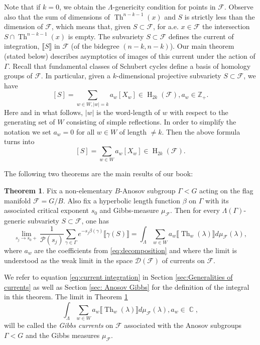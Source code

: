 \documentclass[12pt]{amsbook}%
\theoremstyle{definition}
\newtheorem{introthm}{Theorem}
\theoremstyle{remark}
\numberwithin{section}{chapter}
\numberwithin{subsection}{section}
\numberwithin{figure}{chapter}
\DeclareMathOperator{\C}{\mathbb{C}}
\DeclareMathOperator{\Th}{Th}
\DeclareMathOperator{\coh}{H}
\def\cD{{\mathscr{D}}}
\def\cF{{\mathscr{F}}}
\def\Ga{\Gamma}
\def\ga{\gamma}
\def\La{\Lambda}
\def\la{\lambda}
\begin{document}
Note that if $k=0$, we obtain the $\La$-genericity condition for points in $\cF$. 
Observe also that the sum of dimensions of $\Th^{n-k-1}(x)$ and $S$ is strictly less than the dimension of $\cF$, which means that, 
given $S\subset \cF$, for a.e. $x\in \cF$ the intersection $S\cap \Th^{n-k-1}(x)$ is empty. 
The subvariety $S\subset \cF$ defines the current of integration, $\llbracket S\rrbracket$ in $\cF$ (of the 
bidegree $(n-k,n-k)$). Our main theorem (stated below) describes asymptotics of images of this current under the action of $\Ga$. 
Recall that fundamental classes of Schubert cycles define a basis of homology groups of $\cF$. In particular, given a $k$-dimensional projective subvariety $S\subset \cF$, we have
$$
[S]= \sum_{w\in W, |w|=k} a_w [X_w]\in \coh_{2k}(\cF), a_w\in {\mathbb Z}_+.   
$$ 
Here and in what follows, $|w|$ is the word-length of $w$ with respect to the generating set of $W$ consisting of simple reflections. In order to simplify the notation we set $a_w=0$ for all $w\in W$ of length $\ne k$. Then the above formula turns into 
\begin{equation}\label{eq:decomposition}
[S]= \sum_{w\in W} a_w [X_w]\in \coh_{2k}(\cF).   
\end{equation}

The following two theorems are the main results of our book: 

\begin{introthm}\label{thm:main}Fix a non-elementary $B$-Anosov  subgroup $\Gamma< G$ acting on the flag manifold $\cF=G/B$. 
Also fix a hyperbolic length function $\beta$ on $\Ga$ with its associated critical exponent $s_0$ and Gibbs-measure $\mu_{\cF}$. 
 Then for every $\Lambda(\Ga)$-generic subvariety 
 $S  \subset \cF$, one has 
$$
\lim_{s_j\to s_0+} \frac{1}{{\mathcal P}(s_j)} \sum_{\ga\in \Ga} e^{-s_j\beta(\ga)} \llbracket \ga(S)\rrbracket= \int_{\La}  \sum_{w\in W}  a_w \llbracket\Th_w(\la) \rrbracket d\mu_{\cF}(\la),
$$
where $a_w$ are the coefficients from  \eqref{eq:decomposition} and where 
 the limit is understood as the weak limit in the space $\cD(\cF)$ of currents on $\cF$. 
\end{introthm}



We refer to  equation \eqref{eq:current integration} in Section \ref{sec:Generalities of currents} as well as Section \ref{sec: Anosov Gibbs} 
for the definition of the integral in this theorem. The limit in  Theorem \ref{thm:main}
$$
\int_{\La}  \sum_{w\in W}  a_w \llbracket\Th_w(\la) \rrbracket d\mu_{\cF}(\la), a_w\in \C,$$
will be called the {\em Gibbs currents} on $\cF$ associated with the Anosov subgroups $\Ga< G$ and the Gibbs measures $\mu_{\cF}$. 
\end{document}
